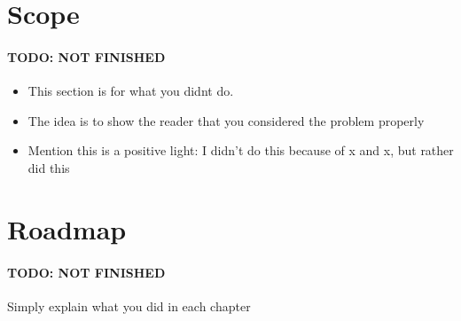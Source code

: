 \section{Scope}

\paragraph{TODO: NOT FINISHED}

\begin{itemize}
    \item This section is for what you didnt do.
    \item The idea is to show the reader that you considered the problem properly
    \item Mention this is a positive light: I didn't do this because of x and x, but rather did this
\end{itemize}

\section{Roadmap}

\paragraph{TODO: NOT FINISHED}

Simply explain what you did in each chapter
